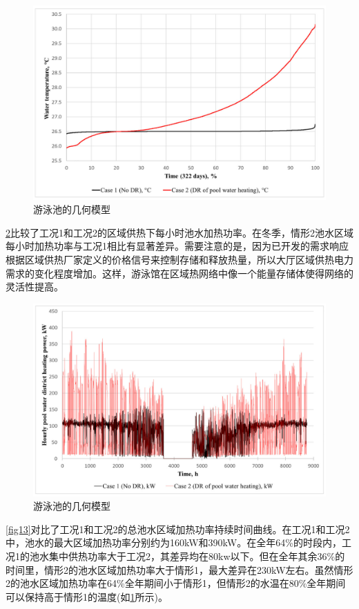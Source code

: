 \documentclass[hyperref]{ctexart}
\begin{document}
\begin{multicols}{2}
		\begin{figure}[htbp]
			\centering
			\includegraphics[scale=0.4]{figure_translate/11.png}
			\caption{游泳池的几何模型}
			\label{fig11}
		\end{figure}
		\cref{fig12}比较了工况1和工况2的区域供热下每小时池水加热功率。在冬季，情形2池水区域每小时加热功率与工况1相比有显著差异。需要注意的是，因为已开发的需求响应根据区域供热厂家定义的价格信号来控制存储和释放热量，所以大厅区域供热电力需求的变化程度增加。这样，游泳馆在区域热网络中像一个能量存储体使得网络的灵活性提高。
		\par
		\begin{figure}[htbp]
			\centering
			\includegraphics[scale=0.4]{figure_translate/12.png}
			\caption{游泳池的几何模型}
			\label{fig12}
		\end{figure}
		\cref{fig13}对比了工况1和工况2的总池水区域加热功率持续时间曲线。在工况1和工况2中，池水的最大区域加热功率分别约为160kW和390kW。在全年64\%的时段内，工况1的池水集中供热功率大于工况2，其差异均在80kw以下。但在全年其余36\%的时间里，情形2的池水区域加热功率大于情形1，最大差异在230kW左右。虽然情形2的池水区域加热功率在64\%全年期间小于情形1，但情形2的水温在80\%全年期间可以保持高于情形1的温度(如\cref{fig11}所示)。

\end{multicols}
\end{document}
